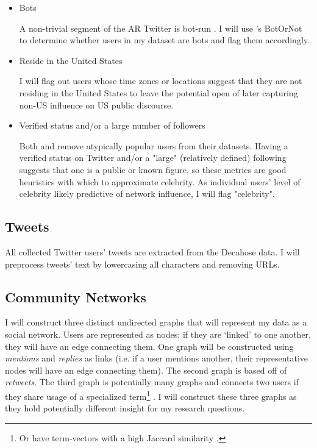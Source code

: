 \documentclass[acmlarge, screen, authorversion]{acmart}
\begin{document}
\begin{itemize}
	\item Bots

	      A non-trivial segment of the AR Twitter is bot-run \cite{bergerAltrightTwitterCensus2018}. I will use \citet{davisBotOrNotSystemEvaluate2016}'s BotOrNot to determine whether users in my dataset are bots and flag them accordingly.

	\item Reside in the United States

	      I will flag out users whose time zones or locations suggest that they are not residing in the United States to leave the potential open of later capturing non-US influence on US public discourse.

	\item Verified status and/or a large number of followers

	      Both \citet{bergerAltrightTwitterCensus2018} and
	      \citet{alizadehPsychologyMoralityPolitical2019} remove atypically popular users from their datasets. Having a verified status on Twitter and/or a
	      "large" (relatively defined) following suggests that one is a public or
	      known figure, so these metrics are good heuristics with which to
	      approximate celebrity. As individual users' level of celebrity likely
	      predictive of network influence, I will flag "celebrity".

\end{itemize}

\subsection{Tweets}

All collected Twitter users' tweets are extracted from the Decahose data. I will preprocess tweets' text by lowercasing all characters and removing URLs.

\subsection{Community Networks}

I will construct three distinct undirected graphs that will represent my data as a
social network. Users are represented as nodes; if they are `linked' to one
another, they will have an edge connecting them. One graph will be constructed
using \textit{mentions} and \textit{replies} as links (i.e. if a user mentions
another, their representative nodes will have an edge connecting them). The
second graph is based off of \textit{retweets}. The third graph is potentially
many graphs and connects two users if they share usage of a specialized
term\footnote{Or have term-vectors with a high Jaccard similarity
\cite{niwattanakulUsingJaccardCoefficient2013}.} . I will construct these three
graphs as they hold potentially different insight for my research questions.
\end{document}
